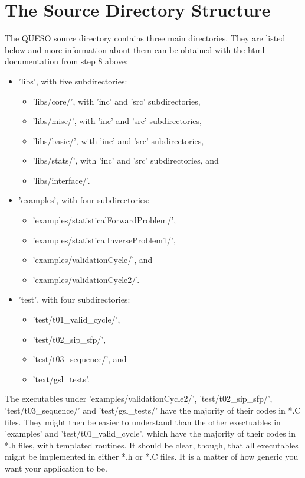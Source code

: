 \section{The Source Directory Structure} \label{sc-source-dir-structure}

The QUESO source directory contains three main directories. They are listed below and more
information about them can be obtained with the html documentation from step 8 above:
\begin{itemize}
\item {'libs', with five subdirectories:
\begin{itemize}
\item 'libs/core/', with 'inc' and 'src' subdirectories,
\item 'libs/misc/', with 'inc' and 'src' subdirectories,
\item 'libs/basic/', with 'inc' and 'src' subdirectories,
\item 'libs/stats/', with 'inc' and 'src' subdirectories, and
\item 'libs/interface/'.
\end{itemize}
}
\item {'examples', with four subdirectories:
\begin{itemize}
\item 'examples/statisticalForwardProblem/',
\item 'examples/statisticalInverseProblem1/',
\item 'examples/validationCycle/', and
\item 'examples/validationCycle2/'.
\end{itemize}
}
\item {'test', with four subdirectories:
\begin{itemize}
\item 'test/t01\_valid\_cycle/',
\item 'test/t02\_sip\_sfp/',
\item 'test/t03\_sequence/', and
\item 'text/gsl\_tests'.
\end{itemize}
}
\end{itemize}

The executables under 'examples/validationCycle2/', 'test/t02\_sip\_sfp/', 'test/t03\_sequence/' and 'test/gsl\_tests/'
have the majority of their codes in *.C files.
They might then be easier to understand than
the other exectuables in 'examples' and 'test/t01\_valid\_cycle', which
have the majority of their codes in *.h files, with templated routines.
It should be clear, though, that all executables might be implemented in either *.h or *.C files.
It is a matter of how generic you want your application to be.

